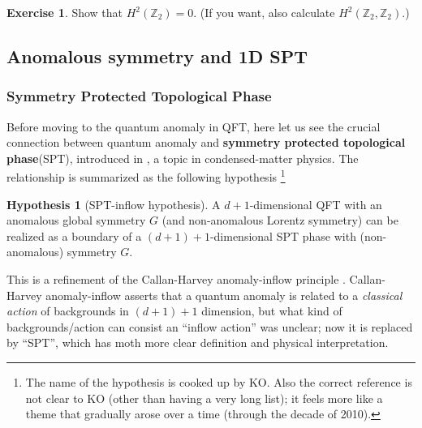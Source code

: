 \documentclass[
]{scrartcl}
\numberwithin{equation}{section}
\theoremstyle{definition}
\theoremstyle{definition}
\theoremstyle{definition}
\newtheorem{exercise}{Exercise}[section]
\theoremstyle{definition}
\newtheorem{hypothesis}{Hypothesis}[section]
\theoremstyle{remark}
\begin{document}
\begin{exercise}
Show that \(H^2(\mathbb{Z}_2)=0\). (If you want, also calculate \(H^2(\mathbb{Z}_2,\mathbb{Z}_2)\).)
\end{exercise}

\hypertarget{anomalous-symmetry-and-1d-spt}{%
\subsection{Anomalous symmetry and 1D SPT}\label{anomalous-symmetry-and-1d-spt}}

\hypertarget{symmetry-protected-topological-phase}{%
\subsubsection{Symmetry Protected Topological Phase}\label{symmetry-protected-topological-phase}}

Before moving to the quantum anomaly in QFT, here let us see the crucial connection between quantum anomaly and \textbf{symmetry protected topological phase}(SPT), introduced in \textcite{Chen:2011pg}, a topic in condensed-matter physics.
The relationship is summarized as the following hypothesis \footnote{The name of the hypothesis is cooked up by KO. Also the correct reference is not clear to KO (other than having a very long list); it feels more like a theme that gradually arose over a time (through the decade of 2010).}

\begin{hypothesis}[SPT-inflow hypothesis]
\protect\hypertarget{hyp:SPT}{}\label{hyp:SPT}A \(d+1\)-dimensional QFT with an anomalous global symmetry \(G\) (and non-anomalous Lorentz symmetry)
can be realized as a boundary of a \((d+1)+1\)-dimensional SPT phase with (non-anomalous) symmetry \(G\).
\end{hypothesis}

This is a refinement of the Callan-Harvey anomaly-inflow principle \textcite{Callan:1984sa}.
Callan-Harvey anomaly-inflow asserts that a quantum anomaly is related to a \emph{classical action} of backgrounds in \((d+1)+1\) dimension, but what kind of backgrounds/action can consist an ``inflow action'' was unclear; now it is replaced by ``SPT'', which has moth more clear definition and physical interpretation.
\end{document}
